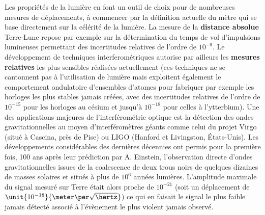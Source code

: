 \documentclass[12pt,a4paper]{article}
\begin{document}
Les propriétés de la lumière en font un outil de choix pour de nombreuses mesures de déplacements, à commencer par la définition actuelle du mètre qui se base directement sur la célérité de la lumière.
La mesure de la \textbf{distance absolue} Terre-Lune repose par exemple sur la détermination du temps de vol d'impulsions lumineuses permettant des incertitudes relatives de l'ordre de $10^{-9}$.
Le développement de techniques interferométriques autorise par ailleurs les \textbf{mesures relatives} les plus sensibles réalisées actuellement (ces techniques ne se cantonnent pas à l'utilisation de lumière mais exploitent également le comportement ondulatoire d'ensembles d'atomes pour fabriquer par exemple les horloges les plus stables jamais créées, avec des incertitudes relatives de l'ordre de $10^{-15}$ pour les horloges au césium et jusqu'à $10^{-18}$ pour celles à l'ytterbium).
Une des applications majeures de l'interférométrie optique est la détection des ondes gravitationnelles au moyen d'interféromètres géants comme celui du projet Virgo (situé à Cascina, près de Pise) ou LIGO (Hanford et Livingston, États-Unis).
Les développements considérables des dernières décennies ont permis pour la première fois, 100 ans après leur prédiction par A. Einstein, l'observation directe d'ondes gravitationnelles issues de la coalescence de deux trous noirs de quelques dizaines de masses solaires et situés à plus de $10^6$ années lumières.
L'amplitude maximale du signal mesuré sur Terre était alors proche de $10^{-21}$ (soit un déplacement de $\unit{10^{-18}}{\meter\per\sqrt{\hertz}}$) ce qui en faisait le signal le plus faible jamais détecté associé à l'évènement le plus violent jamais observé.
\end{document}
